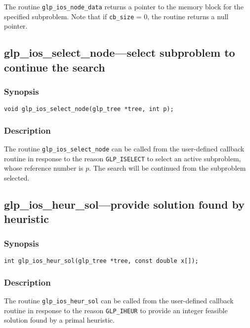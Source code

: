 The routine \verb|glp_ios_node_data| returns a pointer to the memory
block for the specified subproblem. Note that if \verb|cb_size| = 0, the
routine returns a null pointer.

\subsection{glp\_ios\_select\_node---select subproblem to continue the
search}

\subsubsection*{Synopsis}

\begin{verbatim}
void glp_ios_select_node(glp_tree *tree, int p);
\end{verbatim}

\subsubsection*{Description}

The routine \verb|glp_ios_select_node| can be called from the
user-defined callback routine in response to the reason
\verb|GLP_ISELECT| to select an active subproblem, whose reference
number is $p$. The search will be continued from the subproblem
selected.

\newpage

\subsection{glp\_ios\_heur\_sol---provide solution found by heuristic}

\subsubsection*{Synopsis}

\begin{verbatim}
int glp_ios_heur_sol(glp_tree *tree, const double x[]);
\end{verbatim}

\subsubsection*{Description}

The routine \verb|glp_ios_heur_sol| can be called from the user-defined
callback routine in response to the reason \verb|GLP_IHEUR| to provide
an integer feasible solution found by a primal heuristic.

